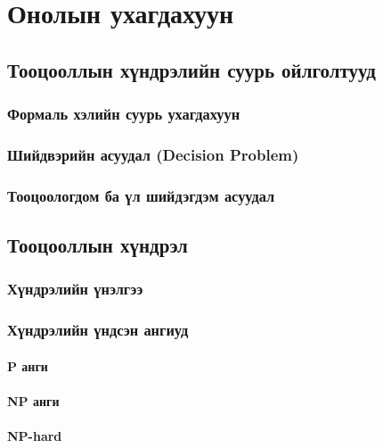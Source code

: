 \chapter{Онолын ухагдахуун}

\section{Тооцооллын хүндрэлийн суурь ойлголтууд}


\subsection{Формаль хэлийн суурь ухагдахуун}

\subsection{Шийдвэрийн асуудал (Decision Problem)}

\subsection{Тооцоологдом ба үл шийдэгдэм асуудал}

\section{Тооцооллын хүндрэл}

\subsection{Хүндрэлийн үнэлгээ}

\subsection{Хүндрэлийн үндсэн ангиуд}

\subsubsection{P анги}

\subsubsection{NP анги}

\subsubsection{NP-hard}

